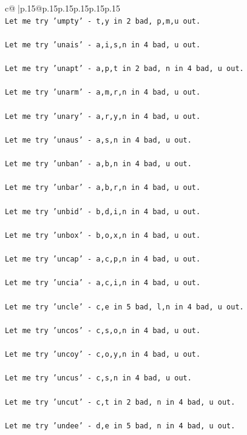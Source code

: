 \documentclass{article}
\begin{document}
{\begin{supertabular}{c@{$\;$}|p{.15\linewidth}@{}p{.15\linewidth}p{.15\linewidth}p{.15\linewidth}p{.15\linewidth}p{.15\linewidth}}
{{{\\ 
\texttt{Let me try 'umpty' {-} t,y in 2 bad, p,m,u out. } \\
\\ 
\texttt{Let me try 'unais' {-} a,i,s,n in 4 bad, u out. } \\
\\ 
\texttt{Let me try 'unapt' {-} a,p,t in 2 bad, n in 4 bad, u out. } \\
\\ 
\texttt{Let me try 'unarm' {-} a,m,r,n in 4 bad, u out. } \\
\\ 
\texttt{Let me try 'unary' {-} a,r,y,n in 4 bad, u out. } \\
\\ 
\texttt{Let me try 'unaus' {-} a,s,n in 4 bad, u out. } \\
\\ 
\texttt{Let me try 'unban' {-} a,b,n in 4 bad, u out. } \\
\\ 
\texttt{Let me try 'unbar' {-} a,b,r,n in 4 bad, u out. } \\
\\ 
\texttt{Let me try 'unbid' {-} b,d,i,n in 4 bad, u out. } \\
\\ 
\texttt{Let me try 'unbox' {-} b,o,x,n in 4 bad, u out. } \\
\\ 
\texttt{Let me try 'uncap' {-} a,c,p,n in 4 bad, u out. } \\
\\ 
\texttt{Let me try 'uncia' {-} a,c,i,n in 4 bad, u out. } \\
\\ 
\texttt{Let me try 'uncle' {-} c,e in 5 bad, l,n in 4 bad, u out. } \\
\\ 
\texttt{Let me try 'uncos' {-} c,s,o,n in 4 bad, u out. } \\
\\ 
\texttt{Let me try 'uncoy' {-} c,o,y,n in 4 bad, u out. } \\
\\ 
\texttt{Let me try 'uncus' {-} c,s,n in 4 bad, u out. } \\
\\ 
\texttt{Let me try 'uncut' {-} c,t in 2 bad, n in 4 bad, u out. } \\
\\ 
\texttt{Let me try 'undee' {-} d,e in 5 bad, n in 4 bad, u out. } \\
}}}
\end{supertabular}}
\end{document}
